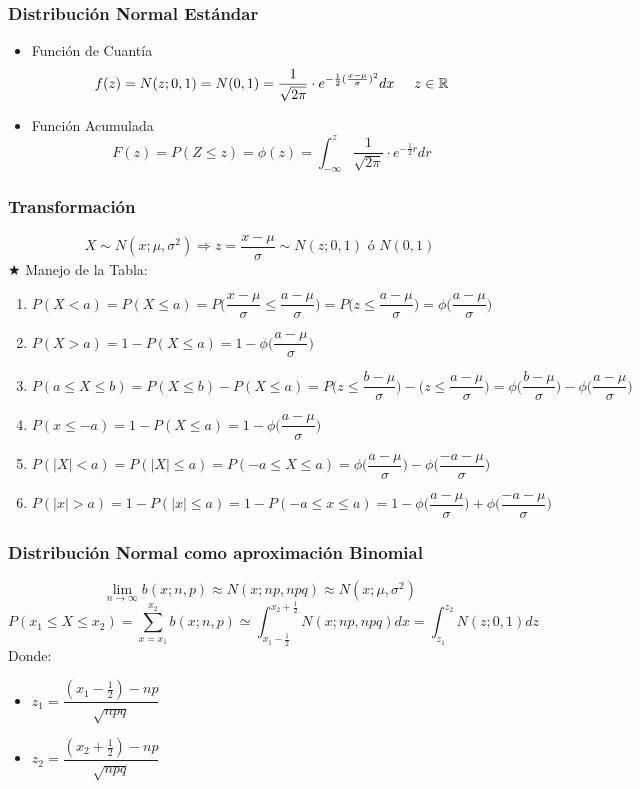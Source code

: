 \documentclass[10pt,letterpaper]{article}
\begin{document}
\subsubsection*{Distribución Normal Estándar}
\begin{itemize}
\item Función de Cuantía \\
$$
f(z)=N(z;0,1)=N(0,1)=\dfrac{1}{\sqrt{2\pi}}\cdot e^{-\frac{1}{2}(\frac{x-\mu}{\sigma})^2} dx \hspace{0.5cm} z\in\mathbb{R}
$$
\item Función Acumulada \\
$$
F(z)=P(Z\leq z)=\phi (z)=\displaystyle\int_{-\infty}^{z} \dfrac{1}{\sqrt{2\pi}}\cdot e^{-\frac{1}{2}r} dr
$$
\end{itemize}
\subsubsection*{Transformación}
$$X\sim N(x;\mu,\sigma^2) \Rightarrow z = \dfrac{x-\mu}{\sigma} \sim N(z;0,1) \text{ ó } N(0,1)$$
\noindent$\bigstar$ Manejo de la Tabla:
\begin{enumerate}
\item $P(X<a)=P(X\leq a) = P \Bigg( \dfrac{x-\mu}{\sigma}\leq\dfrac{a-\mu}{\sigma}\Bigg) 
= P\Bigg( z\leq \dfrac{a-\mu}{\sigma}\Bigg) 
=\phi\Bigg( \dfrac{a-\mu}{\sigma} \Bigg)$
\item 
$
P(X>a) =1-P(X\leq a) 
	 =1-\phi\Bigg(\dfrac{a-\mu}{\sigma}\Bigg)
$
\item 
$
P(a\leq X\leq b)= P(X\leq b)-P(X\leq a) 
                = P\Bigg(z\leq \dfrac{b-\mu}{\sigma}\Bigg)-\Bigg(z\leq \dfrac{a-\mu}{\sigma}\Bigg) 
                =\phi\Bigg(\dfrac{b-\mu}{\sigma}\Bigg)-\phi\Bigg(\dfrac{a-\mu}{\sigma}\Bigg)
$
\item 
$
P(x\leq -a) = 1-P(X\leq a)
            = 1-\phi\Bigg( \dfrac{a-\mu}{\sigma}\Bigg)
$
\item 
$P(|X|<a) = P(|X|\leq a) 
         = P(-a\leq X \leq a) 
         = \phi\Bigg(\dfrac{a-\mu}{\sigma}\Bigg)-\phi\Bigg(\dfrac{-a-\mu}{\sigma}\Bigg)$
\item $
P(|x|>a) = 1-P(|x|\leq a) 
	   = 1-P(-a \leq x \leq a) 
	   = 1 - \phi\Bigg(\dfrac{a-\mu}{\sigma}\Bigg)+\phi\Bigg(\dfrac{-a-\mu}{\sigma}\Bigg)$


\end{enumerate}
\subsubsection*{Distribución Normal como aproximación Binomial}
$$\lim_{n\rightarrow\infty} b(x;n,p)\approx N(x;np,npq)\approx N(x;\mu,\sigma^2)$$
$$
P(x_1\leq X\leq x_2)=\displaystyle\sum_{x=x_1}^{x_2} b(x;n,p)\simeq\displaystyle\int_{x_1-\frac{1}{2}}^{x_2+\frac{1}{2}} N(x;np,npq) dx = \displaystyle\int_{z_1}^{z_2} N(z;0,1) dz
$$
Donde:
\begin{itemize}
\item $z_1=\dfrac{(x_1-\frac{1}{2})-np}{\sqrt{npq}}$
\item $z_2=\dfrac{(x_2+\frac{1}{2})-np}{\sqrt{npq}}$
\end{itemize}
\end{document}
